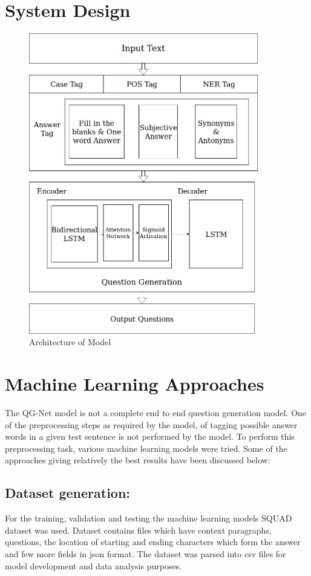 \chapter{System Design}

\begin{figure}
	\caption{Architecture of Model}
	\centering\includegraphics[width=10cm]{5.png}
\end{figure}


\chapter{Machine Learning Approaches}

The QG-Net model is not a complete end to end question generation model. One of
the preprocessing steps as required by the model, of tagging possible answer
words in a given test sentence is not performed by the model. To perform this
preprocessing task, various machine learning models were tried. Some of the
approaches giving relatively the best results have been discussed below:

\section{Dataset generation:}

For the training, validation and testing the machine learning models SQUAD
dataset was used. Dataset contains files which have context paragraphs,
questions, the location of starting and ending characters which form the answer
and few more fields in json format. The dataset was parsed into csv files for
model development and data analysis purposes. 

